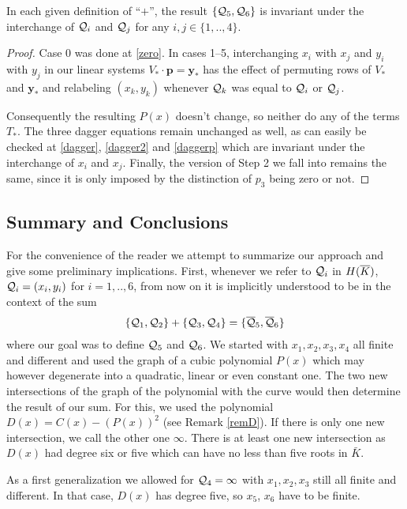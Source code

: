 \documentclass[english,11pt,a4paper]{article}
\begin{document}
\begin{lemma}
In each given definition of ``$+$'', the result $\{ \mathcal{Q}_5, \mathcal{Q}_6 \}$ is invariant under the interchange of $\mathcal{Q}_i$ and $\mathcal{Q}_j$ for any $i,j \in \{ 1,..,4 \}$.

\begin{proof}
  Case 0 was done at \eqref{zero}.
  In cases 1--5, interchanging $x_i$ with $x_j$ and $y_i$ with $y_j$ in our linear systems $V_{\ast} \cdot \mathbf{p} = \mathbf{y}_{\ast}$ has the effect of permuting rows of $V_{\ast}$ and $\mathbf{y}_{\ast}$ and relabeling $(x_k,y_k)$ whenever $\mathcal{Q}_k$ was equal to $\mathcal{Q}_i$ or $\mathcal{Q}_j$.

  Consequently the resulting $P(x)$ doesn't change, so neither do any of the terms $T_{\ast}$. The three dagger equations remain unchanged as well, as can easily be checked at \eqref{dagger}, \eqref{dagger2} and \eqref{daggerp} which are invariant under the interchange of $x_i$ and $x_j$. Finally, the version of Step 2 we fall into remains the same, since it is only imposed by the distinction of $p_3$ being zero or not. 
\end{proof}
\end{lemma}

\subsection{Summary and Conclusions}

For the convenience of the reader we attempt to summarize our approach and give some preliminary implications. First, whenever we refer to $\mathcal{Q}_i$ in $H(\overline K)$, $\mathcal{Q}_i = (x_i, y_i)$ for $i = 1,..,6$, from now on it is implicitly understood to be in the context of the sum
\begin{align*}
  \{\mathcal{Q}_1, \mathcal{Q}_2 \} +\{ \mathcal{Q}_3 , \mathcal{Q}_4 \} = \{\overline {\mathcal{Q}}_5 , \overline {\mathcal{Q}}_6\}
\end{align*}
where our goal was to define $\mathcal{Q}_5$ and $\mathcal{Q}_6$. We started with $x_1, x_2, x_3, x_4$ all finite and different and used the graph of a cubic polynomial $P(x)$ which may however degenerate into a quadratic, linear or even constant one. The two new intersections of the graph of the polynomial with the curve would then determine the result of our sum. For this, we used the polynomial $D(x)=C(x)-(P(x))^2$ (see Remark \ref{remD}). If there is only one new intersection, we call the other one $\infty$. There is at least one new intersection as $D(x)$ had degree six or five which can have no less than five roots in $\bar K$.

As a first generalization we allowed for $\mathcal{Q}_4 = \infty$ with $x_1, x_2, x_3$ still all finite and different. In that case, $D(x)$ has degree five, so $x_5$, $x_6$ have to be finite.
\end{document}
